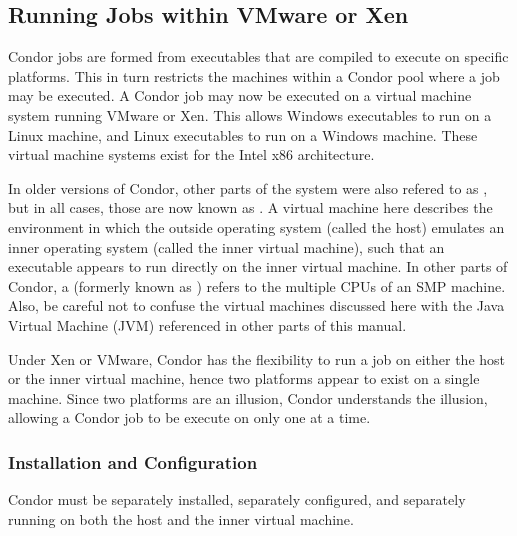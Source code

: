 \subsection{\label{sec:Virtual-Machines}
Running Jobs within VMware or Xen}

Condor jobs are formed from executables that are compiled to execute
on specific platforms.
This in turn restricts the machines within a Condor pool where
a job may be executed.
A Condor job may now be executed on a 
virtual machine system running VMware or Xen.
This allows Windows executables to run on a Linux machine,
and Linux executables to run on a Windows machine.
These virtual machine systems exist for the Intel x86 architecture.

In older versions of Condor, other parts of the system were also
refered to as , but in all cases, those are now
known as .
A virtual machine here describes the environment in which
the outside operating system (called the host) emulates an inner operating
system (called the inner virtual machine),
such that an executable appears to run directly
on the inner virtual machine.
In other parts of Condor, a  (formerly known as
) refers to the multiple CPUs of an SMP
machine.
Also, be careful not to confuse the virtual machines discussed here
with the Java Virtual Machine (JVM) referenced in other parts of this
manual.

Under Xen or VMware, 
Condor has the flexibility to run a job on either the host
or the inner virtual machine, 
hence two platforms appear to exist on a single machine.
Since two platforms are an illusion, Condor understands the illusion, 
allowing a Condor job to be execute on only
one at a time.

\subsubsection{\label{sec:Virtual-Machines-Configuration}
Installation and Configuration}

Condor must be separately installed, separately configured,
and separately running on both
the host and the inner virtual machine.

